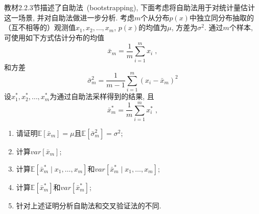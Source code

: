\documentclass[answers]{exam}  %
\begin{document}
\begin{questions}
    教材2.2.3节描述了自助法~(bootstrapping), 下面考虑将自助法用于对统计量估计这一场景, 并对自助法做进一步分析.
    考虑$m$个从分布$p(x)$中独立同分布抽取的（互不相等的）观测值$x_1, x_2, \ldots, x_m$, $p(x)$的均值为$\mu$, 方差为$\sigma^2$. 通过$m$个样本, 可使用如下方式估计分布的均值
    \begin{equation}
        \bar{x}_m = \frac{1}{m} \sum_{i=1}^{m} x_{i}\;,\label{ch2_eq:estimate_mean}
    \end{equation}
    和方差
    \begin{equation}
        \bar{\sigma}^2_m=\frac{1}{m-1} \sum_{i=1}^{m}\left(x_{i}-\bar{x}_m\right)^{2}\label{ch2_eq:estimate_variance}
    \end{equation}
    设$x^*_1, x^*_2, \ldots, x^*_m$为通过自助法采样得到的结果, 且
    \begin{equation}
        \bar{x}^*_m = \frac{1}{m} \sum_{i=1}^{m} x^*_{i}\;,
    \end{equation}
    \begin{enumerate}
        \item 请证明$\mathbb E[\bar{x}_m] = \mu$且$\mathbb E[\bar{\sigma}^2_m] = \sigma^2$;
        \item 计算$var[\bar{x}_m]$;
        \item 计算$\mathbb E[\bar{x}^*_m \mid x_1, \ldots, x_m]$和$var[\bar{x}^*_m \mid x_1, \ldots, x_m]$;
        \item 计算$\mathbb E[\bar{x}^*_m]$和$var[\bar{x}^*_m]$;
        \item 针对上述证明分析自助法和交叉验证法的不同.
    \end{enumerate}


\end{questions}
\end{document}
